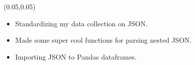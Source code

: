\documentclass[aspectratio=169]{beamer} %
\begin{document}
\begin{frame}{}
    \setlength{\TPHorizModule}{\textwidth}
    \setlength{\TPVertModule}{\textwidth}
    \begin{textblock}{0.74}(0.05,0.05)
        \bfseries\large\textcolor{white}{Useful Intermediate Results}
    \end{textblock}
    \begin{itemize}
        \item Standardizing my data collection on JSON.
        \item Made some super cool functions for parsing nested JSON.
        \item Importing JSON to Pandas dataframes.
    \end{itemize}
\end{frame}
\end{document}
